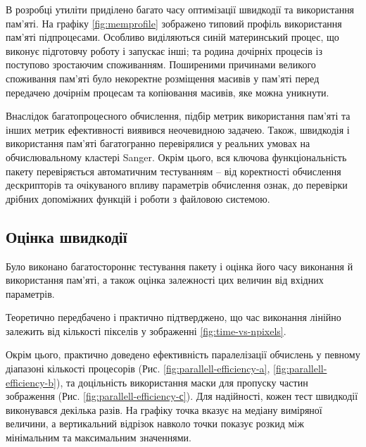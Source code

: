 В розробці утиліти приділено багато часу оптимізації швидкодії та використання пам'яті. 
На графіку \ref{fig:memprofile} зображено типовий профіль використання пам'яті підпроцесами.
Особливо виділяються синій материнський процес, що виконує підготовчу роботу і запускає інші; 
та родина дочірніх процесів із поступово зростаючим споживанням.
Поширеними причинами великого споживання пам'яті було некоректне розміщення масивів у пам'яті перед передачею дочірнім процесам 
та копіювання масивів, яке можна уникнути. 

Внаслідок багатопроцесного обчислення, підбір метрик використання пам'яті та інших метрик ефективності виявився неочевидною задачею.
Також, швидкодія і використання пам'яті багатогранно перевірялися у реальних умовах на обчислювальному кластері Sanger.
Окрім цього, вся ключова функціональність пакету перевіряється автоматичним тестуванням -- від коректності обчислення дескрипторів та очікуваного впливу параметрів обчислення ознак, 
до перевірки дрібних допоміжних функцій і роботи з файловою системою. 

\subsection{Оцінка швидкодії}\label{section2.2d}
Було виконано багатостороннє тестування пакету і оцінка його часу виконання й використання пам'яті, 
а також оцінка залежності цих величин від вхідних параметрів.

Теоретично передбачено і практично підтверджено, що час виконання лінійно залежить від кількості пікселів у зображенні \ref{fig:time-vs-npixels}.

Окрім цього, практично доведено ефективність паралелізації обчислень у певному діапазоні кількості процесорів (Рис. \ref{fig:parallell-efficiency-a}, \ref{fig:parallell-efficiency-b}),
та доцільність використання маски для пропуску частин зображення (Рис. \ref{fig:parallell-efficiency-с}).
Для надійності, кожен тест швидкодії виконувався декілька разів. На графіку точка вказує на медіану виміряної величини, 
а вертикальний відрізок навколо точки показує розкид між мінімальним та максимальним значеннями.

